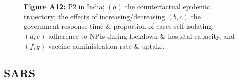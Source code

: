 \documentclass[paper=a4,fontsize=11pt]{article}
\begin{document}
\begin{figure}[!h]
  \\
  \hspace{1.76cm}
  \\
  \caption*{\textbf{Figure A12:} P2 in India; $(a)$ the counterfactual epidemic trajectory; the effects of increasing/decreasing $(b,c)$ the government response time \& proportion of cases self-isolating, $(d,e)$ adherence to NPIs during lockdown \& hospital capacity, and $(f,g)$ vaccine administration rate \& uptake.}
\end{figure}


\subsection{SARS}
\end{document}
